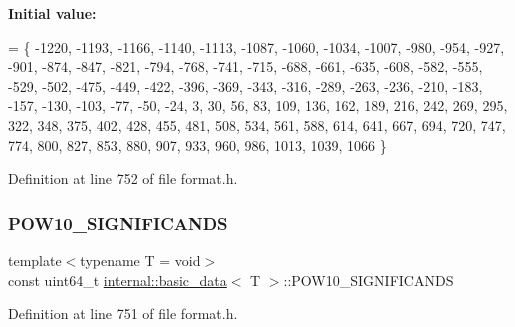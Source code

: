 {\bfseries Initial value\+:}
\begin{DoxyCode}
= \{
  -1220, -1193, -1166, -1140, -1113, -1087, -1060, -1034, -1007,  -980,  -954,
   -927,  -901,  -874,  -847,  -821,  -794,  -768,  -741,  -715,  -688,  -661,
   -635,  -608,  -582,  -555,  -529,  -502,  -475,  -449,  -422,  -396,  -369,
   -343,  -316,  -289,  -263,  -236,  -210,  -183,  -157,  -130,  -103,   -77,
    -50,   -24,     3,    30,    56,    83,   109,   136,   162,   189,   216,
    242,   269,   295,   322,   348,   375,   402,   428,   455,   481,   508,
    534,   561,   588,   614,   641,   667,   694,   720,   747,   774,   800,
    827,   853,   880,   907,   933,   960,   986,  1013,  1039,  1066
\}
\end{DoxyCode}


Definition at line 752 of file format.\+h.

\mbox{\label{structinternal_1_1basic__data_ab03db7a1e27eca63daa49e5e8d17199a}} 
\subsubsection{\texorpdfstring{P\+O\+W10\+\_\+\+S\+I\+G\+N\+I\+F\+I\+C\+A\+N\+DS}{POW10\_SIGNIFICANDS}}
{\footnotesize\ttfamily template$<$typename T  = void$>$ \\
const uint64\+\_\+t \hyperlink{structinternal_1_1basic__data}{internal\+::basic\+\_\+data}$<$ T $>$\+::P\+O\+W10\+\_\+\+S\+I\+G\+N\+I\+F\+I\+C\+A\+N\+DS\hspace{0.3cm}{\ttfamily [static]}}



Definition at line 751 of file format.\+h.

\mbox{\label{structinternal_1_1basic__data_ae0a973c39e9ea682ddc6fa4aba44434f}} 
